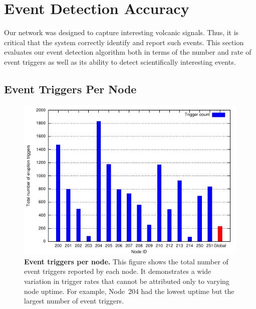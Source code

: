 \section{Event Detection Accuracy}
\label{evaluation-sec-eventdetection}

Our network was designed to capture interesting volcanic signals. Thus, it is
critical that the system correctly identify and report such events. This
section evaluates our event detection algorithm both in terms of the number
and rate of event triggers as well as its ability to detect scientifically
interesting events.

\subsection{Event Triggers Per Node}

\begin{figure}[t]
\begin{center}
\includegraphics[width=\hsize]{./3-evaluation/figs/eruptioncount.pdf}
\end{center}
\caption{\textbf{Event triggers per node.}
This figure shows the total number of event triggers reported by each node.
It demonstrates a wide variation in trigger rates that cannot be attributed
only to varying node uptime. For example, Node~204 had the lowest uptime but
the largest number of event triggers.}
\label{evaluation-fig-eruptioncount}
\end{figure}

